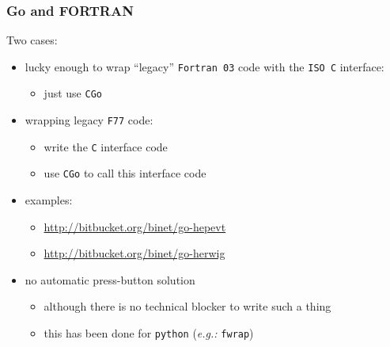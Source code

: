 \documentclass[bigger]{beamer}
\begin{document}
\begin{frame}
\frametitle{Go and FORTRAN}
\label{sec-1-23}


Two cases:

\begin{itemize}
\item lucky enough to wrap ``legacy'' \verb~Fortran 03~ code with the \verb~ISO C~
  interface:
\begin{itemize}
\item just use \verb~CGo~
\end{itemize}
\item wrapping legacy \verb~F77~ code:
\begin{itemize}
\item write the \verb~C~ interface code
\item use \verb~CGo~ to call this interface code
\end{itemize}
\item examples:
\begin{itemize}
\item \href{http://bitbucket.org/binet/go-hepevt}{http://bitbucket.org/binet/go-hepevt}
\item \href{http://bitbucket.org/binet/go-herwig}{http://bitbucket.org/binet/go-herwig}
\end{itemize}
\end{itemize}


\begin{itemize}
\item no automatic press-button solution
\begin{itemize}
\item although there is no technical blocker to write such a thing
\item this has been done for \verb~python~ (\emph{e.g.:} \verb~fwrap~)
\end{itemize}
\end{itemize}
\end{frame}
\end{document}

